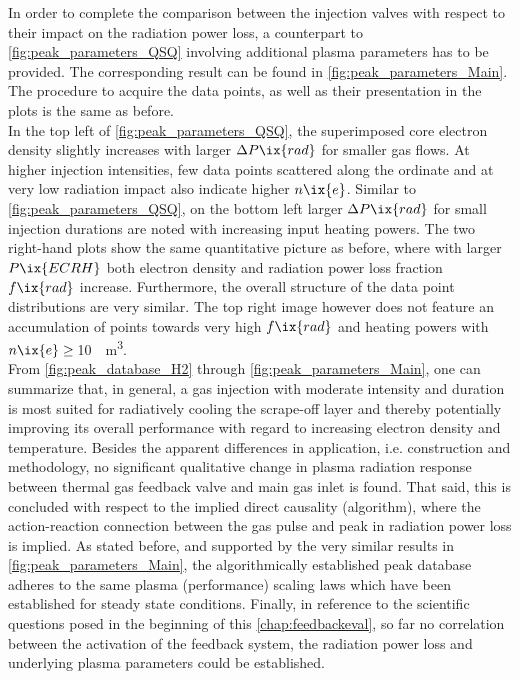 %
            In order to complete the comparison between the injection valves with respect to their impact on the radiation power loss, a counterpart to \cref{fig:peak_parameters_QSQ} involving additional plasma parameters has to be provided. The corresponding result can be found in \cref{fig:peak_parameters_Main}. The procedure to acquire the data points, as well as their presentation in the plots is the same as before.\\%
            In the top left of \cref{fig:peak_parameters_QSQ}, the superimposed core electron density slightly increases with larger $\Delta P\ix{rad}$ for smaller gas flows. At higher injection intensities, few data points scattered along the ordinate and at very low radiation impact also indicate higher $n\ix{e}$. Similar to \cref{fig:peak_parameters_QSQ}, on the bottom left larger $\Delta P\ix{rad}$ for small injection durations are noted with increasing input heating powers. The two right-hand plots show the same quantitative picture as before, where with larger $P\ix{ECRH}$ both electron density and radiation power loss fraction $f\ix{rad}$ increase. Furthermore, the overall structure of the data point distributions are very similar. The top right image however does not feature an accumulation of points towards very high $f\ix{rad}$ and heating powers with $n\ix{e}\ge\,$\SI{10}{\per\cubic\meter}.\\%
            From \cref{fig:peak_database_H2} through \cref{fig:peak_parameters_Main}, one can summarize that, in general, a gas injection with moderate intensity and duration is most suited for radiatively cooling the scrape-off layer and thereby potentially improving its overall performance with regard to increasing electron density and temperature. Besides the apparent differences in application, i.e. construction and methodology, no significant qualitative change in plasma radiation response between thermal gas feedback valve and main gas inlet is found. That said, this is concluded with respect to the implied direct causality (algorithm), where the action-reaction connection between the gas pulse and peak in radiation power loss is implied. As stated before, and supported by the very similar results in \cref{fig:peak_parameters_Main}, the algorithmically established peak database adheres to the same plasma (performance) scaling laws which have been established for steady state conditions. Finally, in reference to the scientific questions posed in the beginning of this \cref{chap:feedbackeval}, so far no correlation between the activation of the feedback system, the radiation power loss and underlying plasma parameters could be established.%
%
